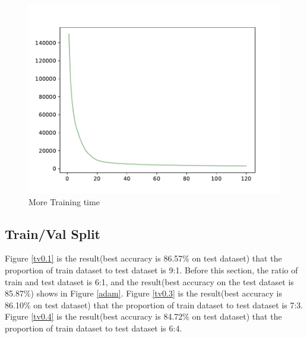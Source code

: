 \documentclass{article}
\begin{document}
\begin{figure}[!h]
{\begin{minipage}{0.21\linewidth}
  \includegraphics[scale=0.23]{imgs/test_loss_fit.pdf}
  \end{minipage}
}
\quad
{}
\caption{More Training time}
\label{over}
\end{figure}

\subsection{Train/Val Split}
Figure \ref{tv0.1} is the result(best accuracy is 86.57\% on test dataset) that the proportion of train dataset to test dataset is 9:1. Before this section, the ratio of train and test dataset is 6:1, and the result(best accuracy on the test dataset is 85.87\%) shows in Figure \ref{adam}. Figure \ref{tv0.3} is the result(best accuracy is 86.10\% on test dataset) that the proportion of train dataset to test dataset is 7:3.   Figure \ref{tv0.4} is the result(best accuracy is 84.72\% on test dataset) that the proportion of train dataset to test dataset is 6:4. 
\end{document}
